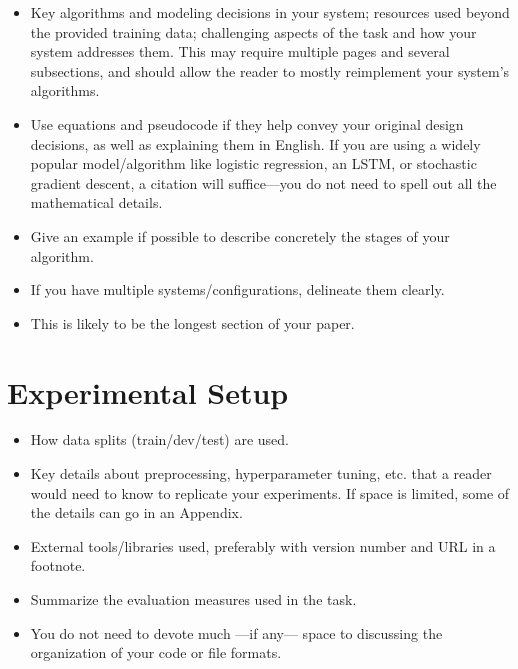 \documentclass[11pt]{article}
\begin{document}
\begin{itemize}
	\item Key algorithms and modeling decisions in your system; resources used beyond the provided training data; challenging aspects of the task and how your system addresses them. This may require multiple pages and several subsections, and should allow the reader to mostly reimplement your system’s algorithms.
	
	\item Use equations and pseudocode if they help convey your original design decisions, as well as explaining them in English. If you are using a widely popular model/algorithm like logistic regression, an LSTM, or stochastic gradient descent, a citation will suffice—you do not need to spell out all the mathematical details.
	
	\item Give an example if possible to describe concretely the stages of your algorithm.
	
	\item If you have multiple systems/configurations, delineate them clearly.
	
	\item This is likely to be the longest section of your paper.
	
\end{itemize}

\section{Experimental Setup}

\begin{itemize}
	\item How data splits (train/dev/test) are used.
	
	\item Key details about preprocessing, hyperparameter tuning, etc. that a reader would need to know to replicate your experiments. If space is limited, some of the details can go in an Appendix.
	
	\item External tools/libraries used, preferably with version number and URL in a footnote.
	
	\item Summarize the evaluation measures used in the task.
	
	\item You do not need to devote much —if any— space to discussing the organization of your code or file formats.
	
\end{itemize}
\end{document}
